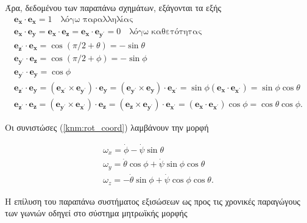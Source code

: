 Άρα, δεδομένου των παραπάνω σχημάτων, εξάγονται τα εξής
\begin{gather*}
    \mathbf{e_{x}} \cdot \mathbf{e_{x}} = 1 \quad \text{λόγω παραλληλίας} \\
    \mathbf{e_{x}} \cdot \mathbf{e_{y}} = \mathbf{e_{x}} \cdot \mathbf{e_{z}} =
        \mathbf{e_{x}} \cdot \mathbf{e_{y^{\prime}}} = 0 \quad 
        \text{λόγω καθετότητας} \\
    \mathbf{e_{z^{\prime}}} \cdot \mathbf{e_{x}} = \cos\left(\pi/2 + 
        \theta\right) = -\sin\theta \\
    \mathbf{e_{y^{\prime}}} \cdot \mathbf{e_{z}} = \cos\left(\pi/2 + 
        \phi\right) = -\sin\phi \\
    \mathbf{e_{y^{\prime}}} \cdot \mathbf{e_{y}} = \cos\phi \\
    \mathbf{e_{z^{\prime}}} \cdot \mathbf{e_{y}} = (\mathbf{e_{x^{\prime}}} 
        \times \mathbf{e_{y^{\prime}}}) \cdot \mathbf{e_{y}} = 
        ( \mathbf{e_{y^{\prime}}} \times \mathbf{e_{y}}) \cdot 
        \mathbf{e_{x^{\prime}}} = \sin\phi (\mathbf{e_{x}} \cdot 
        \mathbf{e_{x^{\prime}}}) = \sin\phi \cos\theta \\
    \mathbf{e_{z^{\prime}}} \cdot \mathbf{e_z} = (\mathbf{e_{y^{\prime}}} 
        \times \mathbf{e_{x^{\prime}}}) \cdot \mathbf{e_z} = (\mathbf{e_z} 
        \times \mathbf{e_{y^{\prime}}}) \cdot \mathbf{e_{x^{\prime}}} = 
        (\mathbf{e_{x}} \cdot \mathbf{e_{x^{\prime}}}) \cos\phi = \cos\theta
        \cos\phi.
\end{gather*}

Οι συνιστώσες (\ref{knm:rot_coord}) λαμβάνουν την μορφή

\begin{gather*}
    \omega_{x} = \dot{\phi} - \dot{\psi} \sin\theta \\
    \omega_{y} = \dot{\theta} \cos\phi + \dot{\psi} \sin\phi \cos\theta \\
    \omega_{z} = -\dot{\theta} \sin\phi + \dot{\psi} \cos\phi \cos\theta.
\end{gather*}

Η επίλυση του παραπάνω συστήματος εξισώσεων ως προς τις χρονικές παραγώγους των 
γωνιών  οδηγεί στο σύστημα μητρωϊκής μορφής

